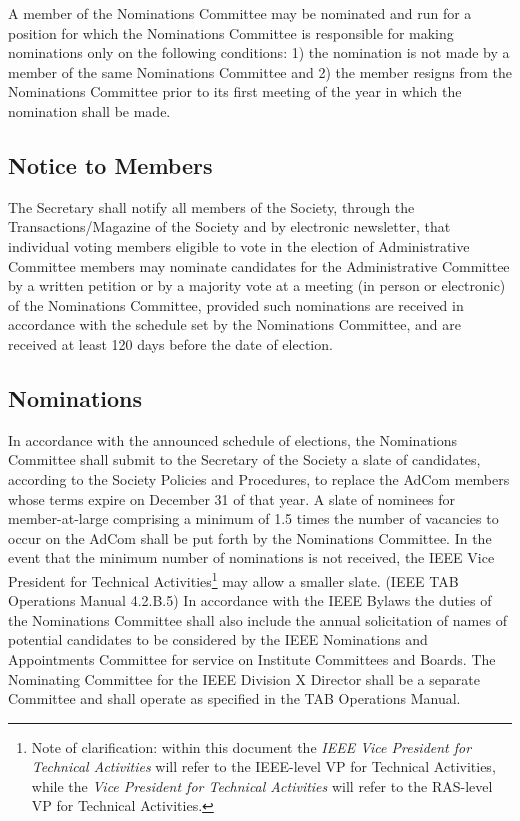\documentclass[10pt]{article}
\begin{document}
A member of the Nominations Committee may be nominated and run for a position for which the Nominations Committee is responsible for making nominations only on the following conditions: 1) the nomination is not made by a member of the same Nominations Committee and 2) the member resigns from the Nominations Committee prior to its first meeting of the year in which the nomination shall be made.


\subsection{Notice to Members}

The Secretary shall notify all members of the Society, through the Transactions/Magazine of the Society and by electronic newsletter, that individual voting members eligible to vote in the election of Administrative Committee members may nominate candidates for the Administrative Committee by a written petition or by a majority vote at a meeting (in person or electronic) of the Nominations Committee, provided such nominations are received in accordance with the schedule set by the Nominations Committee, and are received at least 120 days before the date of election. 


\subsection{Nominations}
In accordance with the announced schedule of elections, the Nominations Committee shall submit to the Secretary of the Society a slate of candidates, according to the Society Policies and Procedures, to replace the AdCom members whose terms expire on December 31 of that year. A slate of nominees for member-at-large comprising a minimum of 1.5 times the number of vacancies to occur on the AdCom shall be put forth by the Nominations Committee. In the event that the minimum number of nominations is not received, the IEEE Vice President for Technical Activities\footnote{Note of clarification: within this document the {\em IEEE Vice President for Technical Activities} will refer to the IEEE-level VP for Technical Activities, while the {\em Vice President for Technical Activities} will refer to the RAS-level VP for Technical Activities.} may allow a smaller slate. (IEEE TAB Operations Manual 4.2.B.5) In accordance with the IEEE Bylaws the duties of the Nominations Committee shall also include the annual solicitation of names of potential candidates to be considered by the IEEE Nominations and Appointments Committee for service on Institute Committees and Boards. The Nominating Committee for the IEEE Division X Director shall be a separate Committee and shall operate as specified in the TAB Operations Manual.
\end{document}
